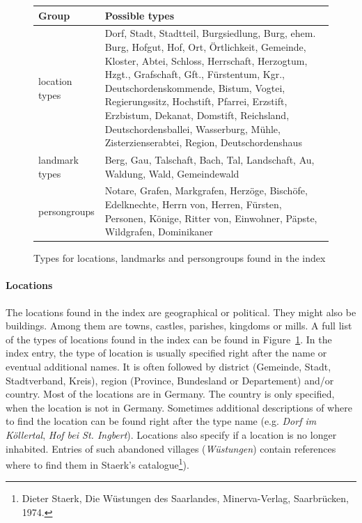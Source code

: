 \begin{figure}[h]
\centering
\begin{tabular}{|l|p{10cm}|}
\hline
\textbf{Group}        & \textbf{Possible types}  \\
\hline
location types & Dorf, Stadt, Stadtteil, Burgsiedlung, Burg,  ehem. Burg, Hofgut, Hof, Ort, Örtlichkeit, Gemeinde, Kloster,   Abtei, Schloss, Herrschaft, Herzogtum, Hzgt., Grafschaft,    Gft., Fürstentum, Kgr., Deutschordenskommende, Bistum,     Vogtei, Regierungssitz, Hochstift, Pfarrei, Erzstift, Erzbistum, Dekanat, Domstift, Reichsland, Deutschordensballei, Wasserburg, Mühle, Zisterzienserabtei, Region, Deutschordenshaus \\
\hline
landmark types & Berg, Gau, Talschaft, Bach, Tal, Landschaft, Au, Waldung, Wald, Gemeindewald \\
\hline
persongroups   & Notare, Grafen, Markgrafen, Herzöge, Bischöfe, Edelknechte, Herrn von, Herren, Fürsten, Personen, Könige, Ritter von, Einwohner, Päpste, Wildgrafen, Dominikaner \\
\hline
\end{tabular} 
\caption{Types for locations, landmarks and persongroups found in the index}
\label{fig:location-list}
\end{figure}

\paragraph{Locations}
The locations found in the index are geographical or political. They might also be buildings. Among them are towns, castles, parishes, kingdoms or mills. A full list of the types of locations found in the index can be found in Figure~\ref{fig:location-list}. In the index entry, the type of location is usually specified right after the name or eventual additional names. It is often followed by district (Gemeinde, Stadt, Stadtverband, Kreis), region (Province, Bundesland or Departement) and/or country. Most of the locations are in Germany. The country is only specified, when the location is not in Germany. Sometimes additional descriptions of where to find the location can be found right after the type name (e.g. \textit{Dorf im Köllertal}, \textit{Hof bei St. Ingbert}). Locations also specify if a location is no longer inhabited. Entries of such abandoned villages (\textit{Wüstungen}) contain references where to find them in Staerk's catalogue\footnote{Dieter Staerk, Die Wüstungen des Saarlandes, Minerva-Verlag, Saarbrücken, 1974.}). %

